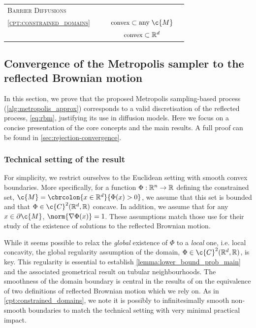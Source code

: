 \begin{table}[t]
\begin{tabular}{lcccc}
		\midrule
		\scshape Barrier Diffusions                                                                                                 \\
		\quad\scshape \cref{cpt:constrained_domains}  & \xmark                    & \xmark \hspace{0.1em} & \(\text{\small convex}\;{\subset}\;\text{any}\;\c{M}\)             & \xmark \\
		\quad\scshape \textcite{liu2024mirror}            & \cmark                    & \cmark & \(\text{\small convex}\;{\subset}\;\mathbb{R}^d\) & \xmark \\

		\bottomrule
	\end{tabular}
\end{table}

\subsection{Convergence of the Metropolis sampler to the reflected Brownian motion}
\label{sec:theoretical_convergence}

In this section, we prove that the proposed Metropolis sampling-based process (\cref{alg:metropolis_approx}) corresponds to a valid discretisation of the reflected process, \cref{eq:rbm}, justifying its use in diffusion models.
Here we focus on a concise presentation of the core concepts and the main results.
A full proof can be found in \cref{sec:rejection-convergence}.

\subsubsection{Technical setting of the result}

For simplicity, we restrict ourselves to the Euclidean setting with smooth convex boundaries.
More specifically, for a function \(\Phi: \mathbb{R}^n \to \mathbb{R}\) defining the constrained set, \(\c{M} = \cbrcolon{x \in \R^d}{\Phi(x) > 0}\), we assume that this set is bounded and that \(\Phi \in \c{C}^2(\R^d, \R)\) concave.
In addition, we assume that for any \(x \in \partial \c{M}\), \(\norm{\nabla \Phi(x)} = 1\).
These assumptions match those \textcite{stroock1971diffusion} use for their study of the existence of solutions to the reflected Brownian motion.

While it seems possible to relax the \emph{global} existence of \(\Phi\) to a \emph{local} one, i.e. local concavity, the global regularity assumption of the domain, \(\Phi \in \c{C}^2(\R^d, \R)\), is key.
This regularity is essential to establish \cref{lemma:lower_bound_prob_main} and the associated geometrical result on tubular neighbourhoods.
The smoothness of the domain boundary is central in the results of \textcite{kang2017submartingale} on the equivalence of two definitions of reflected Brownian motion which we rely on.
As in \cref{cpt:constrained_domains}, we note it is possibly to infinitesimally smooth non-smooth boundaries to match the technical setting with very minimal practical impact.

